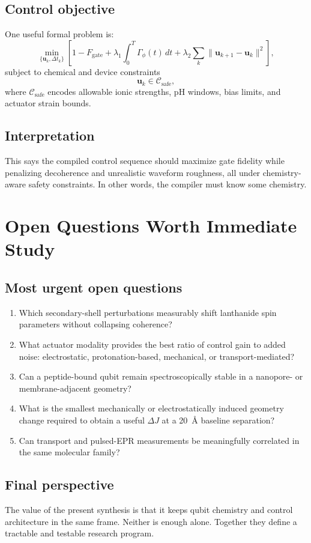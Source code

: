 \documentclass[11pt]{report}
\theoremstyle{definition}
\begin{document}
\section{Control objective}
One useful formal problem is:
\[
\min_{\{\mathbf{u}_k,\Delta t_k\}}
\left[
1 - F_{\mathrm{gate}} +
\lambda_1 \int_0^T \Gamma_\phi(t)\,dt +
\lambda_2 \sum_k \|\mathbf{u}_{k+1}-\mathbf{u}_k\|^2
\right],
\]
subject to chemical and device constraints
\[
\mathbf{u}_k \in \mathcal{C}_{\mathrm{safe}},
\]
where $\mathcal{C}_{\mathrm{safe}}$ encodes allowable ionic strengths, pH windows, bias limits, and actuator strain bounds.

\section{Interpretation}
This says the compiled control sequence should maximize gate fidelity while penalizing decoherence and unrealistic waveform roughness, all under chemistry-aware safety constraints. In other words, the compiler must know some chemistry.

\chapter{Open Questions Worth Immediate Study}

\section{Most urgent open questions}
\begin{enumerate}[leftmargin=2em]
\item Which secondary-shell perturbations measurably shift lanthanide spin parameters without collapsing coherence?
\item What actuator modality provides the best ratio of control gain to added noise: electrostatic, protonation-based, mechanical, or transport-mediated?
\item Can a peptide-bound qubit remain spectroscopically stable in a nanopore- or membrane-adjacent geometry?
\item What is the smallest mechanically or electrostatically induced geometry change required to obtain a useful $\Delta J$ at a 20~\AA{} baseline separation?
\item Can transport and pulsed-EPR measurements be meaningfully correlated in the same molecular family?
\end{enumerate}

\section{Final perspective}
The value of the present synthesis is that it keeps qubit chemistry and control architecture in the same frame. Neither is enough alone. Together they define a tractable and testable research program.
\end{document}
